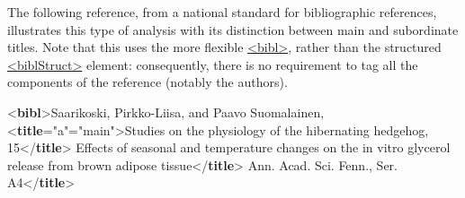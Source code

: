 The following reference, from a national standard for bibliographic references, illustrates this type of analysis with its distinction between main and subordinate titles. Note that this uses the more flexible \hyperref[TEI.bibl]{<bibl>}, rather than the structured \hyperref[TEI.biblStruct]{<biblStruct>} element: consequently, there is no requirement to tag all the components of the reference (notably the authors). \par\bgroup{}\exampleFont \begin{shaded}\noindent\mbox{}{<\textbf{bibl}>}Saarikoski, Pirkko-Liisa, and Paavo Suomalainen,\mbox{}\newline 
{<\textbf{title}\hspace*{1em}{level}="{a}"\hspace*{1em}{type}="{main}">}Studies on the physiology of\mbox{}\newline 
\hspace*{1em}\hspace*{1em} the hibernating hedgehog, 15{</\textbf{title}>}\mbox{}\newline 
{}Effects of seasonal\mbox{}\newline 
\hspace*{1em}\hspace*{1em} and temperature changes on the in vitro glycerol release from\mbox{}\newline 
\hspace*{1em}\hspace*{1em} brown adipose tissue{</\textbf{title}>}\mbox{}\newline 
{}Ann. Acad. Sci. Fenn., Ser. A4{</\textbf{title}>}\mbox{}\newline 

\end{shaded}
